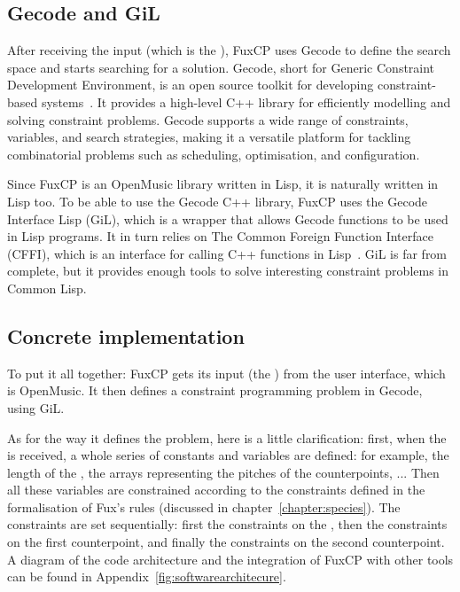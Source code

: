 \subsection{Gecode and GiL}
After receiving the input (which is the \cf), FuxCP uses Gecode to define the search space and starts searching for a solution. Gecode, short for Generic Constraint Development Environment, is an open source toolkit for developing constraint-based systems~\cite{Gecode}. It provides a high-level C++ library for efficiently modelling and solving constraint problems. Gecode supports a wide range of constraints, variables, and search strategies, making it a versatile platform for tackling combinatorial problems such as scheduling, optimisation, and configuration. 


Since FuxCP is an OpenMusic library written in Lisp, it is naturally written in Lisp too. To be able to use the Gecode C++ library, FuxCP uses the Gecode Interface Lisp (GiL), which is a wrapper that allows Gecode functions to be used in Lisp programs. It in turn relies on The Common Foreign Function Interface (CFFI), which is an interface for calling C++ functions in Lisp~\cite{CFFI}.  GiL is far from complete, but it provides enough tools to solve interesting constraint problems in Common Lisp.

\subsection{Concrete implementation}
To put it all together: FuxCP gets its input (the \cf) from the user interface, which is OpenMusic. It then defines a constraint programming problem in Gecode, using GiL. 

As for the way it defines the problem, here is a little clarification: first, when the \cfs is received, a whole series of constants and variables are defined: for example, the length of the \cf, the arrays representing the pitches of the counterpoints, ...
Then all these variables are constrained according to the constraints defined in the formalisation of Fux's rules (discussed in chapter~\ref{chapter:species}). The constraints are set sequentially: first the constraints on the \cf, then the constraints on the first counterpoint, and finally the constraints on the second counterpoint. A diagram of the code architecture and the integration of FuxCP with other tools can be found in Appendix~\ref{fig:softwarearchitecure}.


